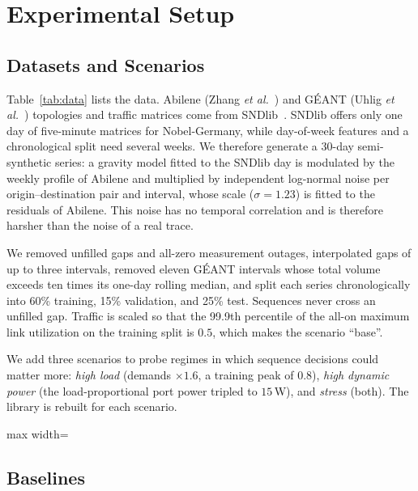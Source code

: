 \documentclass[preprint,12pt]{elsarticle}
\begin{document}
\section{Experimental Setup}\label{sec:setup}

\subsection{Datasets and Scenarios}

Table~\ref{tab:data} lists the data. Abilene (Zhang \emph{et al.}~\cite{zhang2003tomogravity}) and G\'{E}ANT (Uhlig \emph{et al.}~\cite{uhlig2006geant}) topologies and traffic matrices come from SNDlib~\cite{orlowski2010sndlib}. SNDlib offers only one day of five-minute matrices for Nobel-Germany, while day-of-week features and a chronological split need several weeks. We therefore generate a 30-day semi-synthetic series: a gravity model fitted to the SNDlib day is modulated by the weekly profile of Abilene and multiplied by independent log-normal noise per origin--destination pair and interval, whose scale ($\sigma=1.23$) is fitted to the residuals of Abilene. This noise has no temporal correlation and is therefore harsher than the noise of a real trace.

We removed unfilled gaps and all-zero measurement outages, interpolated gaps of up to three intervals, removed eleven G\'{E}ANT intervals whose total volume exceeds ten times its one-day rolling median, and split each series chronologically into 60\% training, 15\% validation, and 25\% test. Sequences never cross an unfilled gap. Traffic is scaled so that the 99.9th percentile of the all-on maximum link utilization on the training split is $0.5$, which makes the scenario ``base''.

We add three scenarios to probe regimes in which sequence decisions could matter more: \emph{high load} (demands $\times1.6$, a training peak of $0.8$), \emph{high dynamic power} (the load-proportional port power tripled to $15$\,W), and \emph{stress} (both). The library is rebuilt for each scenario.

\begin{table}[t]
\centering
\caption{Topologies and Traffic Data}
\label{tab:data}
\footnotesize
\setlength{\tabcolsep}{2.5pt}
\begin{adjustbox}{max width=\textwidth}\end{adjustbox}
\end{table}

\subsection{Baselines}
\end{document}
